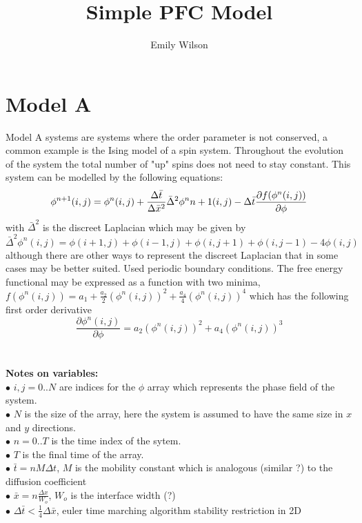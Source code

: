 \documentclass{article}
\begin{document}
\title{Simple PFC Model}
\author{Emily Wilson}

\maketitle


\section*{Model A}
Model A systems are systems where the order parameter is not conserved, a common example is the Ising model of a spin system. Throughout the evolution of the system the total number of "up" spins does not need to stay constant. This system can be modelled by the following equations:
\begin{equation*}
\phi ^ {n + 1} (i,j) = \phi^n(i,j) + \frac{\Delta\bar{t} }{\Delta \bar{x} ^2} \bar{\Delta}^2 \phi^n{n+1} (i, j)- \Delta \bar{t} \frac{\partial f(\phi ^n (i,j))}{\partial{\phi}} \\
\end{equation*}
with $\bar{\Delta}^2$ is the discreet Laplacian which may be given by
\begin{equation*}
\bar{\Delta}^2 \phi ^n (i,j) = \phi(i+1, j) + \phi(i-1, j) + \phi(i, j + 1) + \phi(i, j - 1) - 4 \phi(i,j) 
\end{equation*}
although there are other ways to represent the discreet Laplacian that in some cases may be better suited. Used periodic boundary conditions.  The free energy functional may be expressed as a function with two minima, $f(\phi^n(i,j)) = a_1 + \frac{a_2}{2} (\phi^n(i,j))^2 + \frac{a_4}{4} (\phi^n(i,j))^4 $ which has the following first order derivative
\begin{equation*} 
\frac{\partial{\phi^n(i,j)}}{\partial {\phi}} = a_2 (\phi^n(i,j))^2 + a_4 (\phi^n(i,j))^3
\end{equation*}\\ \\
\textbf{Notes on variables:}\\
$\bullet$ $i, j = 0 .. N$ are indices for the $\phi$ array which represents the phase field of \indent the system. \\
$\bullet$ $N$ is the size of the array, here the system is assumed to have the same size \indent in $x$ and $y$ directions.\\
$\bullet$  $n = 0 .. T$ is the time index of the sytem.\\
$\bullet$  $T$ is the final time of the array.\\
$\bullet$ $\bar{t} = n M \Delta t$, $M$ is the mobility constant which is analogous (similar ?) to the diffusion coefficient\\ 
$\bullet$ $\bar{x} = n \frac{\Delta x}{W_{o}}$, $W_{o}$ is the interface width (?)\\
$\bullet$ $\Delta \bar{t}  <  \frac{1}{4} \Delta \bar{x}$, euler time marching algorithm stability restriction in 2D
\\
\end{document}
